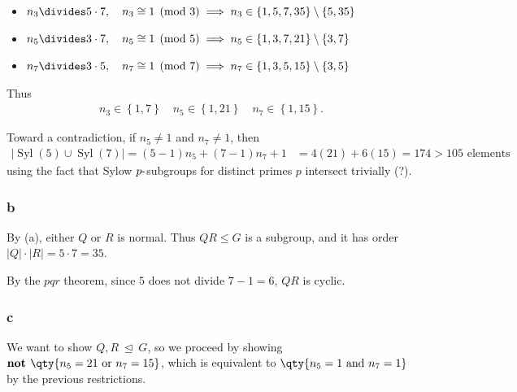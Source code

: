 \begin{solution}
\begin{itemize}
\tightlist
\item
  \(n_3 \divides 5\cdot 7, \quad n_3 \cong 1 \pmod 3 \implies n_3 \in \left\{{1, 5, 7, 35}\right\} \setminus \left\{{5, 35}\right\}\)
\item
  \(n_5 \divides 3\cdot 7, \quad n_5 \cong 1 \pmod 5 \implies n_5 \in \left\{{1, 3, 7, 21}\right\}\setminus \left\{{3, 7}\right\}\)
\item
  \(n_7 \divides 3\cdot 5, \quad n_7 \cong 1 \pmod 7 \implies n_7 \in \left\{{1, 3, 5, 15}\right\}\setminus\left\{{3, 5}\right\}\)
\end{itemize}

Thus
\begin{align*}
n_3 \in \left\{{1, 7}\right\} \quad n_5 \in \left\{{1, 21}\right\} \quad n_7 \in \left\{{1, 15}\right\}
.\end{align*}

Toward a contradiction, if \(n_5\neq 1\) and \(n_7 \neq 1\), then
\begin{align*}
{\left\lvert {{\operatorname{Syl}}(5) \cup{\operatorname{Syl}}(7)} \right\rvert} = (5-1)n_5 + (7-1)n_7 + 1 
&= 4(21) + 6(15) = 174 > 105 \text{ elements}
\end{align*}
using the fact that Sylow \(p{\hbox{-}}\)subgroups for distinct primes
\(p\) intersect trivially (?).

\hypertarget{b-13}{%
\subsubsection{b}\label{b-13}}


By (a), either \(Q\) or \(R\) is normal. Thus \(QR \leq G\) is a
subgroup, and it has order
\({\left\lvert {Q} \right\rvert} \cdot {\left\lvert {R} \right\rvert} = 5\cdot 7 = 35\).

By the \(pqr\) theorem, since \(5\) does not divide \(7-1=6\), \(QR\) is
cyclic.

\hypertarget{c-9}{%
\subsubsection{c}\label{c-9}}

We want to show \(Q, R{~\trianglelefteq~}G\), so we proceed by showing
\(\textbf{not }\qty{n_5 = 21 \text{ or } n_7 = 15}\), which is
equivalent to \(\qty{n_5 = 1 \text{ and } n_7 = 1}\) by the previous
restrictions.


\end{solution}
